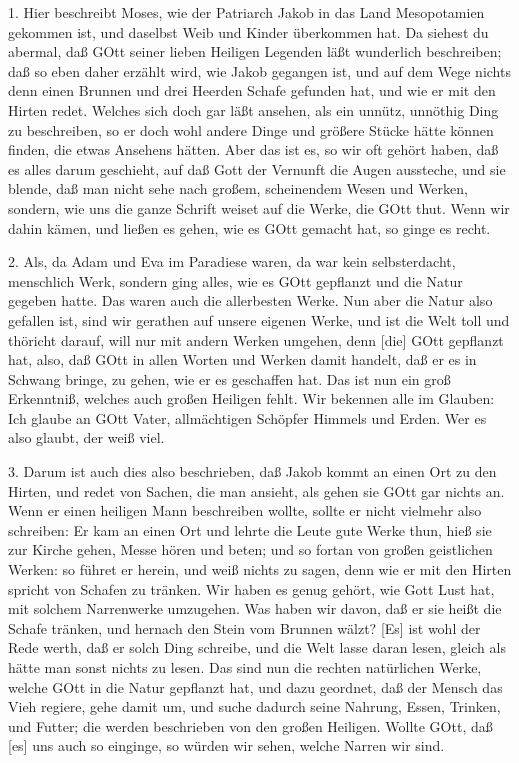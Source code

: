 1. Hier beschreibt Moses, wie der Patriarch Jakob in das Land Mesopotamien gekommen ist, und daselbst Weib und Kinder überkommen hat. Da siehest du abermal, daß GOtt seiner lieben Heiligen Legenden läßt wunderlich beschreiben; daß so eben daher erzählt wird, wie Jakob gegangen ist, und auf dem Wege nichts denn einen Brunnen und drei Heerden Schafe gefunden hat, und wie er mit den Hirten redet. Welches sich doch gar läßt ansehen, als ein unnütz, unnöthig Ding zu beschreiben, so er doch wohl andere Dinge und größere Stücke hätte können finden, die etwas Ansehens hätten. Aber das ist es, so wir oft gehört haben, daß es alles darum geschieht, auf daß Gott der Vernunft die Augen aussteche, und sie blende, daß man nicht sehe nach großem, scheinendem Wesen und Werken, sondern, wie uns die ganze Schrift weiset auf die Werke, die GOtt thut. Wenn wir dahin kämen, und ließen es gehen, wie es GOtt gemacht hat, so ginge es recht.

2. Als, da Adam und Eva im Paradiese waren, da war kein selbsterdacht, menschlich Werk, sondern ging alles, wie es GOtt gepflanzt und die Natur gegeben hatte. Das waren auch die allerbesten Werke. Nun aber die Natur also gefallen ist, sind wir gerathen auf unsere eigenen Werke, und ist die Welt toll und thöricht darauf, will nur mit andern Werken umgehen, denn [die]
GOtt gepflanzt hat, also, daß GOtt in allen Worten und Werken damit handelt, daß er es in Schwang bringe, zu gehen, wie er es geschaffen hat. Das ist nun ein groß Erkenntniß, welches auch großen Heiligen fehlt. Wir bekennen alle im Glauben: Ich glaube an GOtt Vater, allmächtigen Schöpfer Himmels und Erden. Wer es also glaubt, der weiß viel.

3. Darum ist auch dies also beschrieben, daß Jakob kommt an einen Ort zu den Hirten, und redet von Sachen, die man ansieht, als gehen sie GOtt gar nichts an. Wenn er einen heiligen Mann beschreiben wollte, sollte er nicht vielmehr also schreiben: Er kam an einen Ort und lehrte die Leute gute Werke thun, hieß sie zur Kirche gehen, Messe hören und beten; und so fortan von großen geistlichen Werken: so führet er herein, und weiß nichts zu sagen, denn wie er mit den Hirten spricht von Schafen zu tränken. Wir haben es genug gehört, wie Gott Lust hat, mit solchem Narrenwerke umzugehen. Was haben wir davon, daß er sie heißt die Schafe tränken, und hernach den Stein vom Brunnen wälzt? [Es] ist wohl der Rede werth, daß er solch Ding schreibe, und die Welt lasse daran lesen, gleich als hätte man sonst nichts zu lesen. Das sind nun die rechten natürlichen Werke, welche GOtt in die Natur gepflanzt hat, und dazu geordnet, daß der Mensch das Vieh regiere, gehe damit um, und suche dadurch seine Nahrung, Essen, Trinken, und Futter; die werden beschrieben von den großen Heiligen. Wollte GOtt, daß [es] uns auch so einginge, so würden wir sehen, welche Narren wir sind.

